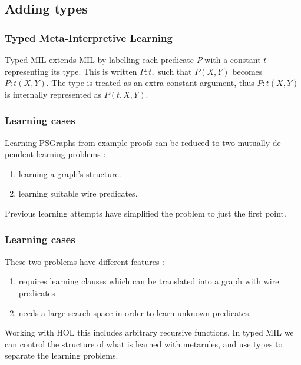 \documentclass[11pt,handout]{beamer}
\begin{document}
\subsection[Adding types]{Adding types}

\begin{frame}
  \frametitle{Typed Meta-Interpretive Learning}

  \begin{tcolorbox}[colback=blue!5!white,colframe=blue!85!black,title=Typed Meta-Interpretive Learning]
    Typed MIL extends MIL by labelling each predicate $P$ with a constant $t$
    representing its type. This is written $P : t,$ such that $P(X,Y)$
    becomes $P : t(X, Y)$. The type is treated as an extra constant argument,
    thus $P : t(X,Y)$ is internally represented as $P(t,X, Y)$.
  \end{tcolorbox}
\end{frame}

\begin{frame}
  \frametitle{Learning cases}
  Learning PSGraphs from example proofs can be reduced to two mutually de-
  pendent learning problems :
  \begin{enumerate}
  \item learning a graph’s structure.
  \item learning suitable wire predicates.
  \end{enumerate}

  Previous learning attempts have simplified the problem to just the first
  point.
\end{frame}

\begin{frame}
  \frametitle{Learning cases}
  
  These two problems have different features :
  
  \begin{enumerate}
  \item requires learning clauses which can be translated into a graph with wire predicates
  \item needs a large search space in order to learn unknown predicates.
  \end{enumerate}

  Working with HOL this includes arbitrary recursive functions. In typed MIL we
  can control the structure of what is learned with metarules, and use types to
  separate the learning problems.
\end{frame}
\end{document}

